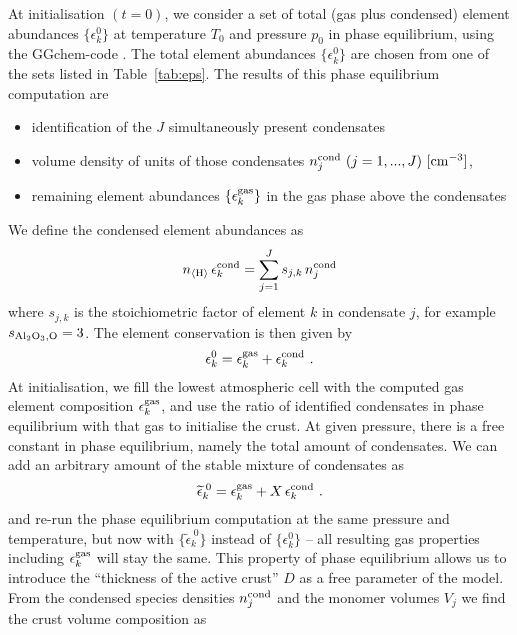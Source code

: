 \documentclass[11pt]{article}
\def\nH{n_{\langle\rm H\rangle}}
\begin{document}
At initialisation $(t=0)$, we consider a set of total (gas plus
condensed) element abundances $\{\epsilon_k^0\}$ at temperature
$T_0$ and pressure $p_0$ in phase equilibrium, using the {\sc
  GGchem}-code \citep{Woitke2017}.  The total element abundances
$\{\epsilon_k^0\}$ are chosen from one of the sets listed in
Table~\ref{tab:eps}. The results of this phase equilibrium 
computation are
\begin{itemize}
\itemsep=-1pt
\parsep=0pt
  \item identification of the $J$ simultaneously present 
        condensates 
  \item volume density of units of those condensates
        $n_j^{\rm cond}\ (j=1,...,J)\ \rm[cm^{-3}]$,
  \item remaining element abundances $\{\epsilon_k^{\rm gas}\}$ in the gas
        phase above the condensates
\end{itemize}
We define the condensed element abundances as
\begin{equation}
  \nH\,\epsilon_k^{\rm cond} = \sum_{j=1}^J s_{j,k}\,n_j^{\rm cond}
\end{equation}
where $s_{j,k}$ is the stoichiometric factor of element $k$ in
condensate $j$, for example $s_{\rm Al_2O_3,O}=3$. The element
conservation is then given by
\begin{equation}
  \epsilon_k^0 = \epsilon_k^{\rm gas} + \epsilon_k^{\rm cond} \ .
\end{equation}
At initialisation, we fill the lowest atmospheric cell with the
computed  gas element composition $\epsilon_k^{\rm gas}$, and use 
the ratio of identified condensates in phase equilibrium with that gas to
initialise the crust. At given pressure, there is a free constant in
phase equilibrium, namely the total amount of condensates. We can add
an arbitrary amount of the stable mixture of condensates as
\begin{equation}
  \widetilde{\epsilon}_k^{\;0} = \epsilon_k^{\rm gas} 
                           + X\,\epsilon_k^{\rm cond} \ .
\end{equation}
and re-run the phase equilibrium computation at the same pressure and
temperature, but now with $\{\widetilde\epsilon_k^{\;0}\}$ instead of
$\{\epsilon_k^0\}$ -- all resulting gas properties including
$\epsilon_k^{\rm gas}$ will stay the same.  This property of phase
equilibrium allows us to introduce the ``thickness of the active
crust'' $D$ as a free parameter of the model. From the condensed
species densities $n_j^{\rm cond}$ and the monomer volumes $V_j$ we
find the crust volume composition as
\end{document}

